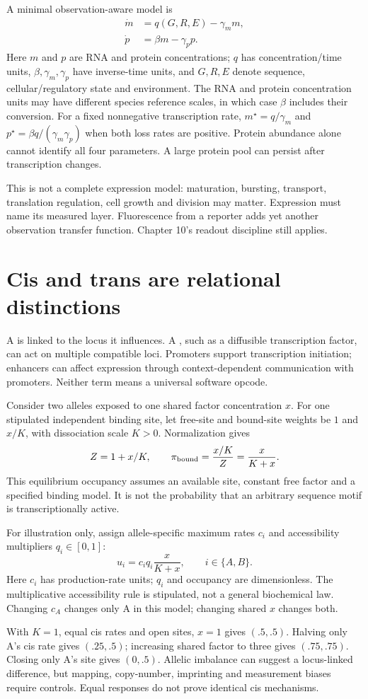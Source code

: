 A minimal observation-aware model is
\begin{align}
 \dot m&=q(G,R,E)-\gamma_m m,\\
 \dot p&=\beta m-\gamma_p p.
\end{align}
Here $m$ and $p$ are RNA and protein concentrations; $q$ has concentration/time
units, $\beta,\gamma_m,\gamma_p$ have inverse-time units, and $G,R,E$ denote
sequence, cellular/regulatory state and environment. The RNA and protein
concentration units may have different species reference scales, in which case
$\beta$ includes their conversion. For a fixed nonnegative transcription rate,
$m^\star=q/\gamma_m$ and $p^\star=\beta q/(\gamma_m\gamma_p)$ when both loss rates
are positive. Protein abundance alone cannot identify all four parameters.
A large protein pool can persist after transcription changes.

This is not a complete expression model: maturation, bursting, transport,
translation regulation, cell growth and division may matter. Expression
must name its measured layer. Fluorescence from a reporter adds yet another
observation transfer function. Chapter 10's readout discipline still applies.

\section{Cis and trans are relational distinctions}
A  is linked to the locus it influences.
A , such as a diffusible transcription factor, can act on
multiple compatible loci. Promoters support transcription initiation; enhancers
can affect expression through context-dependent communication with promoters.
Neither term means a universal software opcode.

Consider two alleles exposed to one shared factor concentration $x$.
For one stipulated independent binding site, let free-site and bound-site weights
be $1$ and $x/K$, with dissociation scale $K>0$. Normalization gives
\[
 Z=1+x/K,\qquad \pi_{\rm bound}=\frac{x/K}{Z}=\frac{x}{K+x}.
\]
This equilibrium occupancy assumes an available site, constant free factor and
a specified binding model. It is not the probability that an arbitrary sequence
motif is transcriptionally active.

For illustration only, assign allele-specific maximum rates $c_i$ and
accessibility multipliers $q_i\in[0,1]$:
\[
 u_i=c_iq_i\frac{x}{K+x},\qquad i\in\{A,B\}.
\]
Here $c_i$ has production-rate units; $q_i$ and occupancy are dimensionless.
The multiplicative accessibility rule is stipulated, not a general biochemical
law. Changing $c_A$ changes only A in this model; changing shared $x$ changes both.
\begin{center}\end{center}
With $K=1$, equal cis rates and open sites, $x=1$ gives $(.5,.5)$.
Halving only A's cis rate gives $(.25,.5)$; increasing shared factor to three gives
$(.75,.75)$. Closing only A's site gives $(0,.5)$.
Allelic imbalance can suggest a locus-linked difference, but mapping,
copy-number, imprinting and measurement biases require controls. Equal responses
do not prove identical cis mechanisms.

